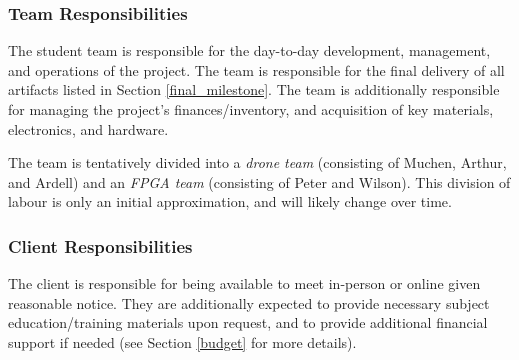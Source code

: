 \subsubsection{Team Responsibilities}
The student team is responsible for the day-to-day development, management, and
operations of the project. The
team is responsible for the final delivery of all artifacts listed in Section
\ref{final_milestone}.
The team is additionally responsible for managing the project's finances/inventory,
and acquisition of key materials, electronics, and hardware.

The team is tentatively divided into a \textit{drone team} (consisting of Muchen, Arthur, and Ardell) and an \textit{FPGA team} (consisting of Peter and Wilson). This division of labour is only an initial approximation, and will likely change over time.

\subsubsection{Client Responsibilities}
The client is responsible for being available to meet in-person or online
given reasonable notice. They are additionally expected to provide necessary subject education/training materials upon request, and to provide additional financial support if needed (see Section \ref{budget} for
more details).
